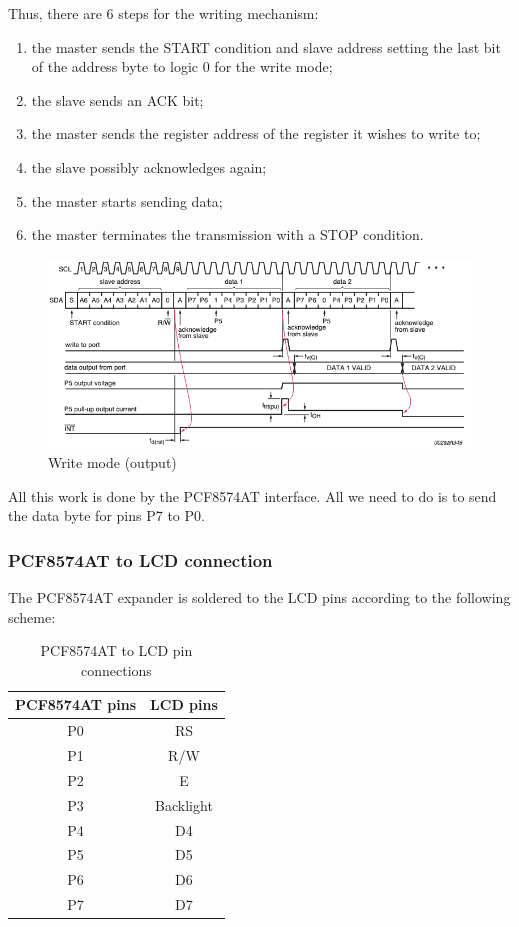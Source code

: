 \documentclass[a4paper, 12pt]{article}
\begin{document}
Thus, there are 6 steps for the writing mechanism:
\begin{enumerate}
    \item the master sends the START condition and slave address setting the
    last bit of the address byte to logic 0 for the write mode;
    \item the slave sends an ACK bit;
    \item the master sends the register address of the register it wishes to write to;
    \item the slave possibly acknowledges again;
    \item the master starts sending data;
    \item the master terminates the transmission with a STOP condition.
\end{enumerate}

\begin{figure}[h]
    \includegraphics[width=14cm]{write_mode_expander}
    \centering
    \caption{Write mode (output)}
\end{figure}

All this work is done by the PCF8574AT interface.
All we need to do is to send the data byte for pins P7 to P0.

\subsubsection{PCF8574AT to LCD connection}
The PCF8574AT expander is soldered to the LCD pins according to the following scheme:

\begin{table}[h]
    \centering
    \begin{tabular}{c c} 
        \hline
        PCF8574AT pins & LCD pins \\ [0.5ex] 
        \hline\hline
        P0 & RS \\
        P1 & R/W \\
        P2 & E \\
        P3 & Backlight \\
        P4 & D4 \\
        P5 & D5 \\
        P6 & D6 \\
        P7 & D7 \\
        \hline
    \end{tabular}
    \caption{PCF8574AT to LCD pin connections}
\end{table}
\end{document}
